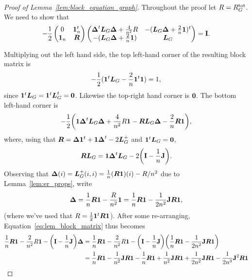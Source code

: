 \begin{proof}[Proof of Lemma~\ref{lem:block_equation_graph}]
	Throughout the proof let  $R=R^{\textnormal{tot}}_G$. We  need  to show that 
	\begin{equation*}
	-\frac{1}{2}\begin{pmatrix}
	0 & \vb{1}_n^t \\ 
	\vb{1}_n &  \vb*{R}
	\end{pmatrix}
	\begin{pmatrix}
	\vb*{\Delta}^t \vb*{L}_G\vb*{\Delta} + \frac{4}{n^2}R & -(\vb*{L}_G\vb*{\Delta} + \frac{2}{n}\vb{1})^t \\
	-(\vb*{L}_G\vb*{\Delta} + \frac{2}{n}\vb{1}) & \vb*{L}_G
	\end{pmatrix} = \vb{I}.
	\end{equation*}
	
	Multiplying out the left hand side, the top left-hand corner of the resulting block matrix is
	\[-\frac{1}{2}(\vb{1}^t\vb*{L}_G - \frac{2}{n}\vb{1}^t \vb{1}) = 1,\]
	since $\vb{1}^t \vb*{L}_G=\vb{1}^t\vb*{L}_G^t =\vb{0}$. Likewise the top-right hand corner is $\vb{0}$. The bottom left-hand corner is 
	\begin{equation}
	\label{eq:lem_block_matrix}
	-\frac{1}{2}\bigg(\vb{1}\vb*{\Delta}^t \vb*{L}_G\vb*{\Delta} +\frac{4}{n^2} R \vb{1} - \vb*{R}\vb*{L}_G\vb*{\Delta} - \frac{2}{n}\vb*{R}\vb{1}\bigg),
	\end{equation}
	where, using that $\vb*{R}=\vb*{\Delta} \vb{1}^t + \vb{1} \vb*{\Delta}^t -2\vb*{L}_G^+$ and $\vb{1}^t\vb*{L}_G=\vb{0}$, 
	\begin{align}
	\vb*{R}\vb*{L}_G = \vb{1}\vb*{\Delta}^t \vb*{L}_G - 2\bigg(\vb{I}-\frac{1}{n}\vb{J}\bigg).\label{eq:lem_block_matrix2}
	\end{align}
	Observing that $\vb*{\Delta}(i) = \vb*{L}_G^+(i,i) = \frac{1}{n}(\vb*{R}\vb{1})(i)  - R/n^2$ due to Lemma~\ref{lem:er_props}, write   
	\begin{equation*}
	\vb*{\Delta} = \frac{1}{n} \vb*{R}\vb{1} - \frac{R}{n^2}\vb{1} = \frac{1}{n} \vb*{R}\vb{1} - \frac{1}{2 n^2}\vb{J}\vb*{R}\vb{1},
	\end{equation*}
	(where we've used that $R=\frac{1}{2}\vb{1}^t\vb*{R}\vb{1}$).  
	After some re-arranging, Equation~\eqref{eq:lem_block_matrix} thus becomes 
	\begin{align*}
	\frac{1}{n}\Reff\one -\frac{2}{n^2}R \one - \bigg(\I-\frac{1}{n}\J\bigg)\bD &= \frac{1}{n}\Reff\one - \frac{2}{n^2}R\one - \bigg(\I-\frac{1}{n}\J\bigg)\bigg(\frac{1}{n}\Reff\one - \frac{1}{2n^2}\J\Reff\one\bigg) \\
	&=\frac{1}{n}\Reff\one - \frac{1}{n^2}\J\Reff\one - \frac{1}{n}\Reff\one + \frac{1}{n^2}\J\Reff\one + \frac{1}{2n^2}\J\Reff\one  - \frac{1}{2n^3}\J^2\Reff\one \\

\end{align*}
\end{proof}
